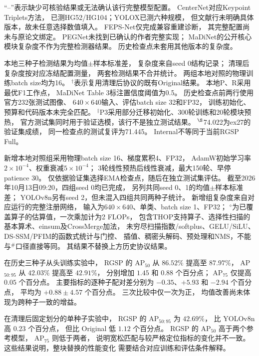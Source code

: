 \begin{table}[!t]
\begin{minipage}{\linewidth}
“--”表示缺少可核验结果或无法确认该行完整模型配置。
CenterNet对应Keypoint Triplets方法，
已测HG52/HG104；YOLOX已测六种规模，
但文献行未明确具体版本，故未任意选择数值填入。
FEPS-Net仅完成兼容重建诊断，
其完整配置尚未与原论文绑定。
PEGNet未找到已确认的作者完整实现；
MaDiNet的公开核心模块复杂度不作为完整检测器结果。
历史检查点未套用其他版本的复杂度。

本地三种子检测结果为均值$\pm$样本标准差，
复杂度来自seed 0结构记录；
清理后复杂度按对应冻结配置测量，
两套检测结果不合并统计。
两组本地对照的物理训练batch size均为16。
$^{\dagger}$表示复用清理后协议的既有Original结果。
本地P、R采用最优F1工作点，
MaDiNet Table 3标注置信度阈值为0.5。
历史检查点前两行使用官方232张测试图像、
$640\times640$输入、评估batch size 32和FP32，
训练初始化、预算和代码版本未完全匹配。
$^{\ddagger}$P3采用部分迁移初始化、300轮训练和20轮模块预热，
官方测试集同时用于验证选模，该行不是独立测试结果。
$^{\S}$74.022为ex27的验证集成绩，
同一检查点的测试复评为71.445。
Internal不等同于当前RGSP Full。

新增本地对照组采用物理batch size 16、梯度累积4、FP32，
AdamW初始学习率$2\times10^{-4}$、权重衰减$5\times10^{-4}$；
3轮线性预热后线性衰减，最大150轮、早停patience 30。
仅依据验证集选择EMA检查点，随后在独立测试集评估。
截至2026年10月13日09:20，四组seed 0均已完成，
另列共同seed 0、1的均值$\pm$样本标准差；
YOLOv8n另有seed 2，但未混入四组共同两种子统计。
新增组复杂度来自对应运行的完整注册网络，
输入为$640\times640$、单类、batch size 1、FP32；
$^{\diamond}$为已覆盖算子的估算值，一次乘加计为2 FLOPs，
包含THOP支持算子、选择性扫描的基本算术、einsum及CrossMerge加法，
未穷尽扫描指数/softplus、GELU/SiLU、DS-SSM/PFIM的函数式统计与门控、
插值、稠密头解码、预处理和NMS，不能与$^{\#}$口径直接等同。
其结果不替换上方历史协议结果。
\end{minipage}
\end{table}

在历史三种子从头训练实验中，
RGSP 的 AP$_{50}$ 从 $86.52\%$ 提高至 $87.97\%$，
AP$_{50:95}$ 从 $42.03\%$ 提高至 $42.91\%$，
分别增加 $1.45$ 和 $0.88$ 个百分点；
AP$_{75}$ 仅提高 $0.05$ 个百分点。
主要指标的逐种子配对差分别为
$-0.35$、$+5.93$ 和 $-2.94$ 个百分点，
平均为 $+0.88\pm4.57$ 个百分点。
三次比较中仅一次为正，
均值改善尚未体现为跨种子一致的增益。

在清理后固定划分的单种子实验中，
RGSP 的 AP$_{50:95}$ 为 $42.69\%$，
比 YOLOv8n 高 $0.23$ 个百分点，
但比 Original 低 $1.12$ 个百分点。
RGSP 的 AP$_{50}$ 高于两个参考模型，
AP$_{75}$ 则低于两者，
说明宽松匹配与较严格定位指标的变化并不一致。
这些结果说明，整块替换的性能变化
需要结合对应训练和评估条件解释。

